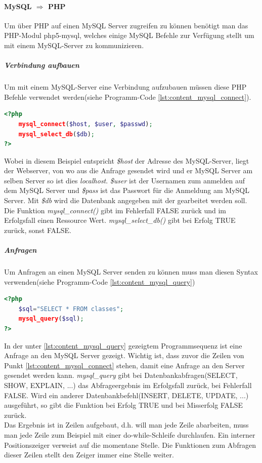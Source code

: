 \paragraph{MySQL $ \Rightarrow $ PHP}
Um über PHP auf einen MySQL Server zugreifen zu können benötigt man das PHP-Modul php5-mysql, welches einige MySQL Befehle zur Verfügung stellt um mit einem MySQL-Server zu kommunizieren.\\
\subparagraph{Verbindung aufbauen}
Um mit einem MySQL-Server eine Verbindung aufzubauen müssen diese PHP Befehle verwendet werden(siehe Programm-Code \ref{lst:content_mysql_connect}).
\begin{lstlisting}[style=custom, language=PHP, caption={MySQL Connect},label={lst:content_mysql_connect}]
<?php 
	mysql_connect($host, $user, $passwd);
	mysql_select_db($db);
?>
\end{lstlisting}
Wobei in diesem Beispiel entspricht \textit{\$host} der Adresse des MySQL-Server, liegt der Webserver, von wo aus die Anfrage gesendet wird und er MySQL Server am selben Server so ist dies \textit{localhost}. \textit{\$user} ist der Usernamen zum anmelden auf dem MySQL Server und \textit{\$pass} ist das Passwort für die Anmeldung am MySQL Server. Mit \textit{\$db} wird die Datenbank angegeben mit der gearbeitet werden soll. Die Funktion \textit{mysql\_connect()} gibt im Fehlerfall FALSE zurück und im Erfolgsfall einen Ressource Wert. \textit{mysql\_select\_db()} gibt bei Erfolg TRUE zurück, sonst FALSE.
\subparagraph{Anfragen}
Um Anfragen an einen MySQL Server senden zu können muss man diesen Syntax verwenden(siehe Programm-Code \ref{lst:content_mysql_query})
\begin{lstlisting}[style=custom, language=PHP, caption={MySQL Querys},label={lst:content_mysql_query}]
<?php 
	$sql="SELECT * FROM classes";
	mysql_query($sql);
?>
\end{lstlisting}
In der unter \ref{lst:content_mysql_query} gezeigtem Programmsequenz ist eine Anfrage an den MySQL Server gezeigt. Wichtig ist, dass zuvor die Zeilen von Punkt \ref{lst:content_mysql_connect} stehen, damit eine Anfrage an den Server gesendet werden kann. \textit{mysql\_query} gibt bei Datenbankabfragen(SELECT, SHOW, EXPLAIN, ...) das Abfrageergebnis im Erfolgsfall zurück, bei Fehlerfall FALSE. Wird ein anderer Datenbankbefehl(INSERT, DELETE, UPDATE, ...) ausgeführt, so gibt die Funktion bei Erfolg TRUE und bei Misserfolg FALSE zurück.\\
Das Ergebnis ist in Zeilen aufgebaut, d.h. will man jede Zeile abarbeiten, muss man jede Zeile zum Beispiel mit einer do-while-Schleife durchlaufen. Ein interner Positionszeiger verweist auf die momentane Stelle. Die Funktionen zum Abfragen dieser Zeilen stellt den Zeiger immer eine Stelle weiter.\\
